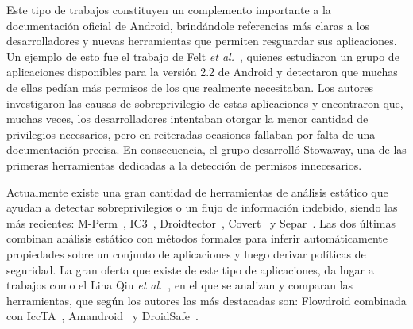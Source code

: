 
Este tipo de trabajos constituyen un complemento importante a la documentación oficial de Android,
brindándole referencias más claras a los desarrolladores y nuevas herramientas que permiten
resguardar sus aplicaciones. Un ejemplo de esto fue el trabajo de Felt \textit{et al.}~\cite{felt},
quienes estudiaron un grupo de aplicaciones disponibles para la versión 2.2 de Android y detectaron
que muchas de ellas pedían más permisos de los que realmente necesitaban. Los autores investigaron
las causas de sobreprivilegio de estas aplicaciones y encontraron que, muchas veces, los
desarrolladores intentaban otorgar la menor cantidad de privilegios necesarios, pero en reiteradas
ocasiones fallaban por falta de una documentación precisa. En consecuencia, el grupo desarrolló
Stowaway, una de las primeras herramientas dedicadas a la detección de permisos innecesarios.

Actualmente existe una gran cantidad de herramientas de análisis estático que ayudan a detectar
sobreprivilegios o un flujo de información indebido, siendo las más recientes:
%
M-Perm~\cite{mperm},
%
IC3~\cite{ic3},
Droidtector~\cite{droidtector},
Covert~\cite{covert} y Separ~\cite{separ}.
Las dos últimas combinan análisis estático con métodos formales para inferir automáticamente
propiedades sobre un conjunto de aplicaciones y luego derivar políticas de seguridad. La gran oferta
que existe de este tipo de aplicaciones, da lugar a trabajos como el Lina Qiu \textit{et
    al.}~\cite{qiu}, en el que se analizan y comparan las herramientas, que según los autores las más
destacadas son: Flowdroid combinada con IccTA~\cite{iccta}, Amandroid~\cite{amandroid} y
DroidSafe~\cite{droidsafe}.

